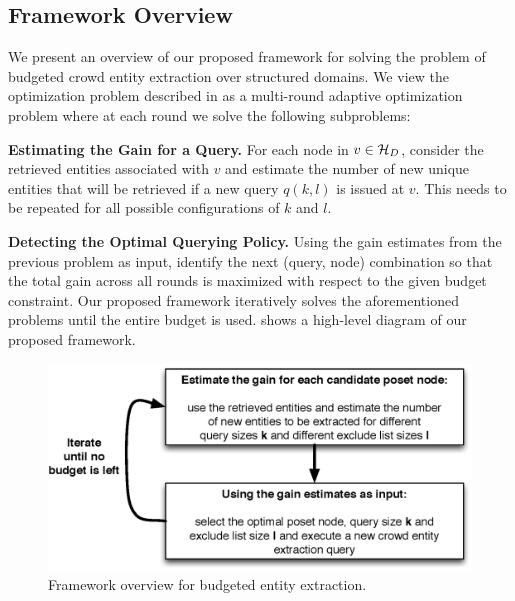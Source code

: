 \subsection{Framework Overview}
\label{sec:framework}
We present an overview of our proposed framework for solving the problem of budgeted crowd entity extraction over structured domains. We view the optimization problem described in  as a multi-round adaptive optimization problem where at each round we solve the following subproblems: 
\squishlist 
\item \textbf{Estimating the Gain for a Query.} For each node in $v \in \mathcal{H}_D$, consider the retrieved entities associated with $v$ and estimate the number of new unique entities that will be retrieved if a new query $q(k,l)$ is issued at $v$. This needs to be repeated for all possible configurations of $k$ and $l$.
\item \textbf{Detecting the Optimal Querying Policy.} Using the gain estimates from the previous problem as input, identify the next (query, node) combination so that the total gain across all rounds is maximized with respect to the given budget constraint. 
\squishend
Our proposed framework iteratively solves the aforementioned problems until the entire budget is used.  shows a high-level diagram of our proposed framework. 

\begin{figure}
	\begin{center}
	\includegraphics[clip,scale=0.43]{figs/framework.eps}
	\vspace{-10pt}
	\caption{Framework overview for budgeted entity extraction.}
	\label{fig:framework}
	\end{center}
	\vspace{-20pt}
\end{figure}
